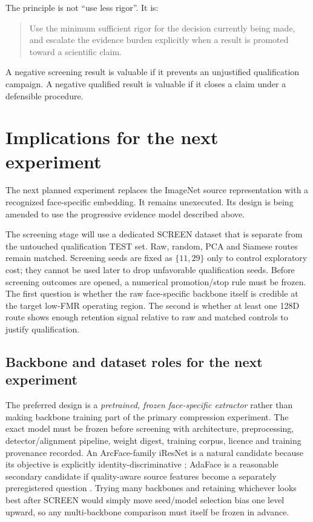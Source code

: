 \documentclass[10pt,a4paper]{article}
\begin{document}
The principle is not ``use less rigor''. It is:
\begin{quote}
Use the minimum sufficient rigor for the decision currently being made, and escalate the
evidence burden explicitly when a result is promoted toward a scientific claim.
\end{quote}

A negative screening result is valuable if it prevents an unjustified qualification
campaign. A negative qualified result is valuable if it closes a claim under a defensible
procedure.

\section{Implications for the next experiment}\label{sec:next}

The next planned experiment replaces the ImageNet source representation with a recognized
face-specific embedding. It remains unexecuted. Its design is being amended to use the
progressive evidence model described above.

The screening stage will use a dedicated SCREEN dataset that is separate from the untouched
qualification TEST set. Raw, random, PCA and Siamese routes remain matched. Screening seeds
are fixed as $\{11,29\}$ only to control exploratory cost; they cannot be used later to drop
unfavorable qualification seeds. Before screening outcomes are opened, a numerical
promotion/stop rule must be frozen. The first question is whether the raw face-specific
backbone itself is credible at the target low-FMR operating region. The second is whether at
least one 128D route shows enough retention signal relative to raw and matched controls to
justify qualification.

\subsection{Backbone and dataset roles for the next experiment}

The preferred design is a \emph{pretrained, frozen face-specific extractor} rather than
making backbone training part of the primary compression experiment. The exact model must be
frozen before screening with architecture, preprocessing, detector/alignment pipeline,
weight digest, training corpus, licence and training provenance recorded. An ArcFace-family
iResNet is a natural candidate because its objective is explicitly identity-discriminative
\cite{arcface2019}; AdaFace is a reasonable secondary candidate if quality-aware source
features become a separately preregistered question \cite{adaface2022}. Trying many
backbones and retaining whichever looks best after SCREEN would simply move seed/model
selection bias one level upward, so any multi-backbone comparison must itself be frozen in
advance.
\end{document}
